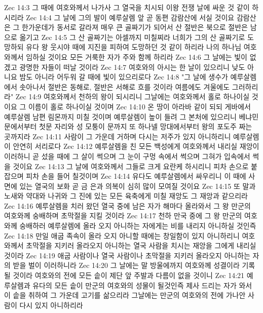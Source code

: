 Zec 14:3  그 때에 여호와께서 나가사 그 열국을 치시되 이왕 전쟁 날에 싸운 것 같이 하시리라
Zec 14:4  그 날에 그의 발이 예루살렘 앞 곧 동편 감람산에 서실 것이요 감람산은 그 한가운데가 동서로 갈라져 매우 큰 골짜기가 되어서 산 절반은 북으로 절반은 남으로 옮기고
Zec 14:5  그 산 골짜기는 아셀까지 미칠찌라 너희가 그의 산 골짜기로 도망하되 유다 왕 웃시야 때에 지진을 피하여 도망하던 것 같이 하리라 나의 하나님 여호와께서 임하실 것이요 모든 거룩한 자가 주와 함께 하리라
Zec 14:6  그 날에는 빛이 없겠고 광명한 자들이 떠날 것이라
Zec 14:7  여호와의 아시는 한 날이 있으리니 낮도 아니요 밤도 아니라 어두워 갈 때에 빛이 있으리로다
Zec 14:8  "그 날에 생수가 예루살렘에서 솟아나서 절반은 동해로, 절반은 서해로 흐를 것이라 여름에도 겨울에도 그러하리라"
Zec 14:9  여호와께서 천하의 왕이 되시리니 그날에는 여호와께서 홀로 하나이실 것이요 그 이름이 홀로 하나이실 것이며
Zec 14:10  온 땅이 아라바 같이 되되 게바에서 예루살렘 남편 림몬까지 미칠 것이며 예루살렘이 높이 들려 그 본처에 있으리니 베냐민 문에서부터 첫문 자리와 성 모퉁이 문까지 또 하나넬 망대에서부터 왕의 포도주 짜는 곳까지라
Zec 14:11  사람이 그 가운데 거하며 다시는 저주가 있지 아니하리니 예루살렘이 안연히 서리로다
Zec 14:12  예루살렘을 친 모든 백성에게 여호와께서 내리실 재앙이 이러하니 곧 섰을 때에 그 살이 썩으며 그 눈이 구멍 속에서 썩으며 그혀가 입속에서 썩을 것이요
Zec 14:13  그 날에 여호와께서 그들로 크게 요란케 하시리니 피차 손으로 붙잡으며 피차 손을 들어 칠것이며
Zec 14:14  유다도 예루살렘에서 싸우리니 이 때에 사면에 있는 열국의 보화 곧 금 은과 의복이 심히 많이 모여질 것이요
Zec 14:15  또 말과 노새와 약대와 나귀와 그 진에 있는 모든 육축에게 미칠 재앙도 그 재앙과 같으리라
Zec 14:16  예루살렘을 치러 왔던 열국 중에 남은 자가 해마다 올라와서 그 왕 만군의 여호와께 숭배하며 초막절을 지킬 것이라
Zec 14:17  천하 만국 중에 그 왕 만군의 여호와께 숭배하러 예루살렘에 올라 오지 아니하는 자에게는 비를 내리지 아니하실 것인즉
Zec 14:18  만일 애굽 족속이 올라 오지 아니할 때에는 창일함이 있지 아니하리니 여호와께서 초막절을 지키러 올라오지 아니하는 열국 사람을 치시는 재앙을 그에게 내리실 것이라
Zec 14:19  애굽 사람이나 열국 사람이나 초막절을 지키러 올라오지 아니하는 자의 받을 벌이 이러하니라
Zec 14:20  그 날에는 말 방울에까지 여호와께 성결이라 기록될 것이라 여호와의 전에 모든 솥이 제단 앞 주발과 다름이 없을 것이니
Zec 14:21  예루살렘과 유다의 모든 솥이 만군의 여호와의 성물이 될것인즉 제사 드리는 자가 와서 이 솥을 취하여 그 가운데 고기를 삶으리라 그날에는 만군의 여호와의 전에 가나안 사람이 다시 있지 아니하리라


